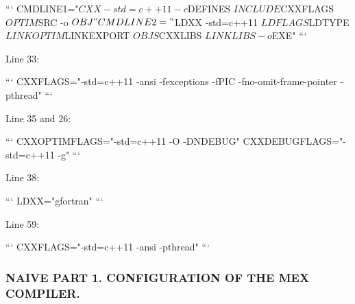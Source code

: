 \begin{DoxyPre}```
CMDLINE1="$CXX -std=c++11 -c $DEFINES $INCLUDE $CXXFLAGS $OPTIM $SRC -o $OBJ"
CMDLINE2="$LDXX -std=c++11 $LDFLAGS $LDTYPE $LINKOPTIM $LINKEXPORT $OBJS $CXXLIBS $LINKLIBS -o $EXE"
```\end{DoxyPre}



\begin{DoxyPre}Line 33:\end{DoxyPre}



\begin{DoxyPre}```
CXXFLAGS="-std=c++11 -ansi -fexceptions -fPIC -fno-omit-frame-pointer -pthread"
```\end{DoxyPre}



\begin{DoxyPre}Line 35 and 26:\end{DoxyPre}



\begin{DoxyPre}```
CXXOPTIMFLAGS="-std=c++11 -O -DNDEBUG"
CXXDEBUGFLAGS="-std=c++11 -g"
```\end{DoxyPre}



\begin{DoxyPre}Line 38:\end{DoxyPre}



\begin{DoxyPre}```
LDXX="gfortran"
```\end{DoxyPre}



\begin{DoxyPre}Line 59:\end{DoxyPre}



\begin{DoxyPre}```
CXXFLAGS="-std=c++11 -ansi -pthread"
```\end{DoxyPre}



\begin{DoxyPre}\subsubsection*{NAIVE PART 1. CONFIGURATION OF THE MEX COMPILER.}\end{DoxyPre}



